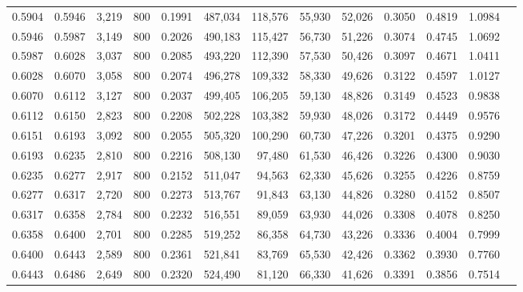 \begin{tabular}{rrrrrrrrrrrrr}
0.5904 & 0.5946 &  3,219 &   800 &                                     0.1991 & 487,034 & 118,576 &  55,930 &  52,026 & 0.3050 & 0.4819 & 1.0984 \\
0.5946 & 0.5987 &  3,149 &   800 &                                     0.2026 & 490,183 & 115,427 &  56,730 &  51,226 & 0.3074 & 0.4745 & 1.0692 \\
0.5987 & 0.6028 &  3,037 &   800 &                                     0.2085 & 493,220 & 112,390 &  57,530 &  50,426 & 0.3097 & 0.4671 & 1.0411 \\
0.6028 & 0.6070 &  3,058 &   800 &                                     0.2074 & 496,278 & 109,332 &  58,330 &  49,626 & 0.3122 & 0.4597 & 1.0127 \\
0.6070 & 0.6112 &  3,127 &   800 &                                     0.2037 & 499,405 & 106,205 &  59,130 &  48,826 & 0.3149 & 0.4523 & 0.9838 \\
0.6112 & 0.6150 &  2,823 &   800 &                                     0.2208 & 502,228 & 103,382 &  59,930 &  48,026 & 0.3172 & 0.4449 & 0.9576 \\
0.6151 & 0.6193 &  3,092 &   800 &                                     0.2055 & 505,320 & 100,290 &  60,730 &  47,226 & 0.3201 & 0.4375 & 0.9290 \\
0.6193 & 0.6235 &  2,810 &   800 &                                     0.2216 & 508,130 &  97,480 &  61,530 &  46,426 & 0.3226 & 0.4300 & 0.9030 \\
0.6235 & 0.6277 &  2,917 &   800 &                                     0.2152 & 511,047 &  94,563 &  62,330 &  45,626 & 0.3255 & 0.4226 & 0.8759 \\
0.6277 & 0.6317 &  2,720 &   800 &                                     0.2273 & 513,767 &  91,843 &  63,130 &  44,826 & 0.3280 & 0.4152 & 0.8507 \\
0.6317 & 0.6358 &  2,784 &   800 &                                     0.2232 & 516,551 &  89,059 &  63,930 &  44,026 & 0.3308 & 0.4078 & 0.8250 \\
0.6358 & 0.6400 &  2,701 &   800 &                                     0.2285 & 519,252 &  86,358 &  64,730 &  43,226 & 0.3336 & 0.4004 & 0.7999 \\
0.6400 & 0.6443 &  2,589 &   800 &                                     0.2361 & 521,841 &  83,769 &  65,530 &  42,426 & 0.3362 & 0.3930 & 0.7760 \\
0.6443 & 0.6486 &  2,649 &   800 &                                     0.2320 & 524,490 &  81,120 &  66,330 &  41,626 & 0.3391 & 0.3856 & 0.7514 \\

\end{tabular}
